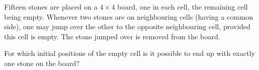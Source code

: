 Fifteen stones are placed on a $4 \times 4$ board, one in each cell, the remaining cell being empty. Whenever two stones are on neighbouring cells (having a common side), one may jump over the other to the opposite neighbouring cell, provided this cell is empty. The stone jumped over is removed from the board.

For which initial positions of the empty cell is it possible to end up with exactly one stone on the board?